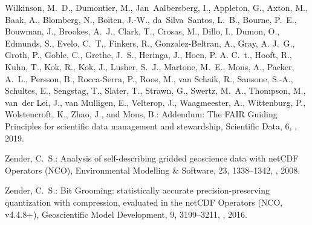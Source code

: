 \documentclass[essd, manuscript]{copernicus}
\begin{document}
\begin{thebibliography}{52}
Wilkinson, M.~D., Dumontier, M., Jan~Aalbersberg, I., Appleton, G., Axton, M.,
  Baak, A., Blomberg, N., Boiten, J.-W., da~Silva~Santos, L.~B., Bourne, P.~E.,
  Bouwman, J., Brookes, A.~J., Clark, T., Crosas, M., Dillo, I., Dumon, O.,
  Edmunds, S., Evelo, C.~T., Finkers, R., Gonzalez-Beltran, A., Gray, A. J.~G.,
  Groth, P., Goble, C., Grethe, J.~S., Heringa, J., Hoen, P. A. C.~t., Hooft,
  R., Kuhn, T., Kok, R., Kok, J., Lusher, S.~J., Martone, M.~E., Mons, A.,
  Packer, A.~L., Persson, B., Rocca-Serra, P., Roos, M., van Schaik, R.,
  Sansone, S.-A., Schultes, E., Sengstag, T., Slater, T., Strawn, G., Swertz,
  M.~A., Thompson, M., van~der Lei, J., van Mulligen, E., Velterop, J.,
  Waagmeester, A., Wittenburg, P., Wolstencroft, K., Zhao, J., and Mons, B.:
  Addendum: The FAIR Guiding Principles for scientific data management and
  stewardship, Scientific Data, 6, , 2019.

Zender, C.~S.: Analysis of self-describing gridded geoscience data with netCDF
  Operators (NCO), Environmental Modelling \& Software, 23, 1338–1342,
  , 2008.

Zender, C.~S.: Bit Grooming: statistically accurate precision-preserving
  quantization with compression, evaluated in the netCDF Operators (NCO,
  v4.4.8+), Geoscientific Model Development, 9, 3199–3211,
  , 2016.

\end{thebibliography}
\end{document}
